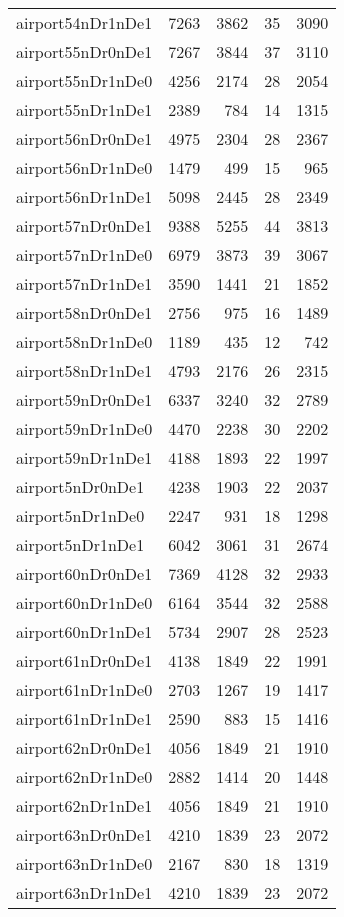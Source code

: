 \begin{longtable}{lrrrr}
airport54nDr1nDe1 & 7263 & 3862 & 35 & 3090 \\
airport55nDr0nDe1 & 7267 & 3844 & 37 & 3110 \\
airport55nDr1nDe0 & 4256 & 2174 & 28 & 2054 \\
airport55nDr1nDe1 & 2389 & 784 & 14 & 1315 \\
airport56nDr0nDe1 & 4975 & 2304 & 28 & 2367 \\
airport56nDr1nDe0 & 1479 & 499 & 15 & 965 \\
airport56nDr1nDe1 & 5098 & 2445 & 28 & 2349 \\
airport57nDr0nDe1 & 9388 & 5255 & 44 & 3813 \\
airport57nDr1nDe0 & 6979 & 3873 & 39 & 3067 \\
airport57nDr1nDe1 & 3590 & 1441 & 21 & 1852 \\
airport58nDr0nDe1 & 2756 & 975 & 16 & 1489 \\
airport58nDr1nDe0 & 1189 & 435 & 12 & 742 \\
airport58nDr1nDe1 & 4793 & 2176 & 26 & 2315 \\
airport59nDr0nDe1 & 6337 & 3240 & 32 & 2789 \\
airport59nDr1nDe0 & 4470 & 2238 & 30 & 2202 \\
airport59nDr1nDe1 & 4188 & 1893 & 22 & 1997 \\
airport5nDr0nDe1 & 4238 & 1903 & 22 & 2037 \\
airport5nDr1nDe0 & 2247 & 931 & 18 & 1298 \\
airport5nDr1nDe1 & 6042 & 3061 & 31 & 2674 \\
airport60nDr0nDe1 & 7369 & 4128 & 32 & 2933 \\
airport60nDr1nDe0 & 6164 & 3544 & 32 & 2588 \\
airport60nDr1nDe1 & 5734 & 2907 & 28 & 2523 \\
airport61nDr0nDe1 & 4138 & 1849 & 22 & 1991 \\
airport61nDr1nDe0 & 2703 & 1267 & 19 & 1417 \\
airport61nDr1nDe1 & 2590 & 883 & 15 & 1416 \\
airport62nDr0nDe1 & 4056 & 1849 & 21 & 1910 \\
airport62nDr1nDe0 & 2882 & 1414 & 20 & 1448 \\
airport62nDr1nDe1 & 4056 & 1849 & 21 & 1910 \\
airport63nDr0nDe1 & 4210 & 1839 & 23 & 2072 \\
airport63nDr1nDe0 & 2167 & 830 & 18 & 1319 \\
airport63nDr1nDe1 & 4210 & 1839 & 23 & 2072 \\

\end{longtable}
